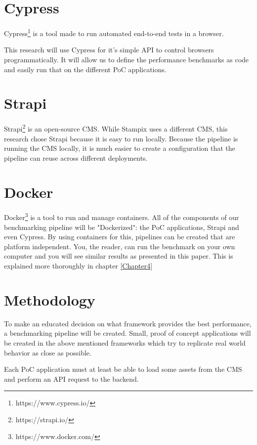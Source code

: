 \section{Cypress}

Cypress\footnote{https://www.cypress.io/} is a tool made to run automated end-to-end tests in a browser. 

This research will use Cypress for it's simple API to control browsers programmatically. It will allow us to define the performance benchmarks as code and easily run that on the different PoC applications.

\section{Strapi}

Strapi\footnote{https://strapi.io/} is an open-source CMS. While Stampix uses a different CMS, this research chose Strapi because it is easy to run locally. 
Because the pipeline is running the CMS locally, it is much easier to create a configuration that the pipeline can reuse across different deployments. 


\section{Docker}

Docker\footnote{https://www.docker.com/} is a tool to run and manage containers. All of the components of our benchmarking pipeline will be "Dockerized": the PoC applications, Strapi and even Cypress. 
By using containers for this, pipelines can be created that are platform independent. 
You, the reader, can run the benchmark on your own computer and you will see similar results as presented in this paper. This is explained more thoroughly in chapter \ref{Chapter4}


\section{Methodology}

To make an educated decision on what framework provides the best performance, a benchmarking pipeline will be created. 
Small, proof of concept applications will be created in the above mentioned frameworks which try to replicate real world behavior as close as possible.

Each PoC application must at least be able to load some assets from the CMS and perform an API request to the backend.



